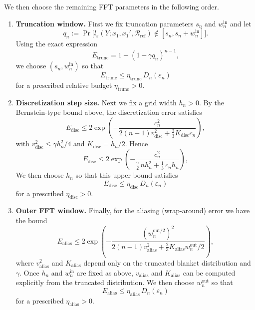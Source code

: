 \documentclass{article}
\theoremstyle{plain}
\theoremstyle{definition}
\begin{document}
We then choose the remaining FFT parameters in the following order.

\begin{enumerate}
  \item \textbf{Truncation window.}
  First we fix truncation parameters $s_n$ and $w_n^{\mathrm{in}}$ and let
  \[
    q_n
    :=
    \Pr\bigl[
      l_\varepsilon(Y;x_1,x_1',\mathcal R_{\mathrm{ref}})
      \notin [s_n,s_n+w_n^{\mathrm{in}}]
    \bigr].
  \]
  Using the exact expression
  \[
    E_{\mathrm{trunc}}
    = 1 - (1-\gamma q_n)^{n-1},
  \]
  we choose $(s_n,w_n^{\mathrm{in}})$ so that
  \[
    E_{\mathrm{trunc}}
    \le
    \eta_{\mathrm{trunc}}\,D_n(\varepsilon_n)
  \]
  for a prescribed relative budget $\eta_{\mathrm{trunc}}>0$.

  \item \textbf{Discretization step size.}
  Next we fix a grid width $h_n>0$. By the Bernstein-type bound above,
  the discretization error satisfies
  \[
    E_{\mathrm{disc}}
    \le
    2\exp\!\left(
      -\frac{c_n^2}{
        2(n-1)v_{\mathrm{disc}}^2
        + \frac{2}{3}K_{\mathrm{disc}} c_n
      }
    \right),
  \]
  with $v_{\mathrm{disc}}^2\le\gamma h_n^2/4$ and $K_{\mathrm{disc}}=h_n/2$.
  Hence
  \[
    E_{\mathrm{disc}}
    \le
    2\exp\!\left(
      -\frac{c_n^2}{
        \frac{\gamma}{2}\,n h_n^2 + \frac{1}{3}\,c_n h_n
      }
    \right),
  \]
  We then choose $h_n$ so that this upper bound satisfies
  \[
    E_{\mathrm{disc}}
    \le
    \eta_{\mathrm{disc}}\,D_n(\varepsilon_n)
  \]
  for a prescribed $\eta_{\mathrm{disc}}>0$.

  \item \textbf{Outer FFT window.}
  Finally, for the aliasing (wrap-around) error we have the bound
  \[
    E_{\mathrm{alias}}
    \le
    2\exp\!\left(
      -\frac{(w_n^{\mathrm{out}/2})^2}{
        2(n-1)v_{\mathrm{alias}}^2
        + \frac{2}{3}K_{\mathrm{alias}} w_n^{\mathrm{out}}/2
      }
    \right),
  \]
  where $v_{\mathrm{alias}}^2$ and $K_{\mathrm{alias}}$ depend only on the
  truncated blanket distribution and $\gamma$. Once $h_n$ and
  $w_n^{\mathrm{in}}$ are fixed as above, $v_{\mathrm{alias}}$ and
  $K_{\mathrm{alias}}$ can be computed explicitly from the truncated
  distribution. We then choose $w_n^{\mathrm{out}}$ so that
  \[
    E_{\mathrm{alias}}
    \le
    \eta_{\mathrm{alias}}\,D_n(\varepsilon_n)
  \]
  for a prescribed $\eta_{\mathrm{alias}}>0$.
\end{enumerate}

\end{document}
